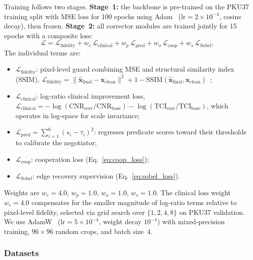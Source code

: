 \documentclass{ieeetj}
\begin{document}
Training follows two stages. \textbf{Stage~1:} the backbone is pre-trained on the PKU37 training split with MSE loss for 100 epochs using Adam~\cite{kingma2015adam} ($\text{lr} = 2\!\times\!10^{-4}$, cosine decay), then frozen. \textbf{Stage~2:} all corrector modules are trained jointly for 15 epochs with a composite loss:
\begin{equation}
\mathcal{L} = \mathcal{L}_\text{fidelity} + w_c\,\mathcal{L}_\text{clinical} + w_p\,\mathcal{L}_\text{pred} + w_o\,\mathcal{L}_\text{coop} + w_s\,\mathcal{L}_\text{Sobel},
\label{eq:total_loss}
\end{equation}
The individual terms are:
\begin{itemize}
\item $\mathcal{L}_\text{fidelity}$: pixel-level guard combining MSE and structural similarity index (SSIM), $\mathcal{L}_\text{fidelity} = \|\hat{\mathbf{x}}_\text{final} - \mathbf{x}_\text{clean}\|^2 + 1 - \text{SSIM}(\hat{\mathbf{x}}_\text{final}, \mathbf{x}_\text{clean})$~\cite{wang2004image};
\item $\mathcal{L}_\text{clinical}$: log-ratio clinical improvement loss, $\mathcal{L}_\text{clinical} = -\log(\text{CNR}_\text{corr}/\text{CNR}_\text{base}) - \log(\text{TCI}_\text{corr}/\text{TCI}_\text{base})$, which operates in log-space for scale invariance;
\item $\mathcal{L}_\text{pred} = \sum_{i=1}^{6}(s_i - \tau_i)^2$: regresses predicate scores toward their thresholds to calibrate the negotiator;
\item $\mathcal{L}_\text{coop}$: cooperation loss (Eq.~\eqref{eq:coop_loss});
\item $\mathcal{L}_\text{Sobel}$: edge recovery supervision (Eq.~\eqref{eq:sobel_loss}).
\end{itemize}
Weights are $w_c = 4.0$, $w_p = 1.0$, $w_o = 1.0$, $w_s = 1.0$. The clinical loss weight $w_c = 4.0$ compensates for the smaller magnitude of log-ratio terms relative to pixel-level fidelity, selected via grid search over $\{1, 2, 4, 8\}$ on PKU37 validation. We use AdamW~\cite{loshchilov2019decoupled} ($\text{lr} = 5\!\times\!10^{-4}$, weight decay $10^{-4}$) with mixed-precision training, $96\times 96$ random crops, and batch size~4.

\subsubsection{Datasets}
\label{sec:datasets}
\end{document}
